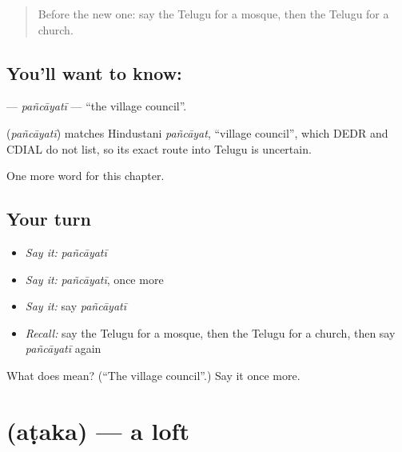 \label{lesson:TE-C293-pancayati}



\begin{quote}
Before the new one: say the Telugu for a mosque, then the Telugu for a church.
\end{quote}

\subsection*{You'll want to know: }
\textbf{} — \emph{pañcāyatī} — \textquotedblleft{}the village council\textquotedblright{}.

\begin{cousinweb}
\textbf{} (\emph{pañcāyatī}) matches Hindustani \emph{pañcāyat}, \textquotedblleft{}village council\textquotedblright{}, which DEDR and CDIAL do not list, so its exact route into Telugu is uncertain.
\end{cousinweb}

\begin{grammarlens}[title={What you've built}]
One more word for this chapter.
\end{grammarlens}

\subsection*{Your turn}
\begin{itemize}
\raggedright
  \item \emph{Say it:} \emph{pañcāyatī}
  \item \emph{Say it:} \emph{pañcāyatī}, once more
  \item \emph{Say it:} say \emph{pañcāyatī}
  \item \emph{Recall:} say the Telugu for a mosque, then the Telugu for a church, then say \emph{pañcāyatī} again
\end{itemize}

\begin{tcolorbox}[breakable,colback=teal!4,colframe=teal!35!black,title={Before you move on}]
What does  mean? (\textquotedblleft{}The village council\textquotedblright{}.) Say it once more.
\end{tcolorbox}
\section[\texorpdfstring{\te{అటక} (aṭaka)}{అటక (aṭaka)}]{ (aṭaka) — a loft}

